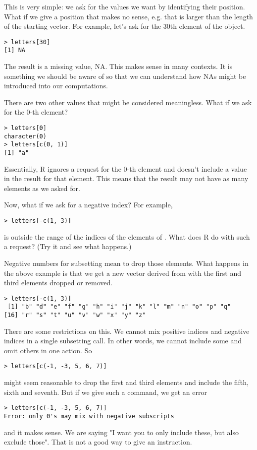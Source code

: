 This is very simple: we ask for the values we want by identifying
their position. What if we give a position that makes no sense,
e.g. that is larger than the length of the starting vector. For
example, let's ask for the 30th element of the 
object.
\begin{verbatim}
> letters[30]
[1] NA
\end{verbatim}
The result is a missing value, NA. This makes sense in many
contexts. It is something we should be aware of so that we can
understand how NAs might be introduced into our computations.

There are two other values that might be considered meaningless. What
if we ask for the 0-th element?
\begin{verbatim}
> letters[0]
character(0)
> letters[c(0, 1)]
[1] "a"
\end{verbatim}
Essentially, R ignores a request for the 0-th element and doesn't
include a value in the result for that element. This means that the
result may not have as many elements as we asked for.

Now, what if we ask for a negative index? For example,
\begin{verbatim}
> letters[-c(1, 3)]
\end{verbatim}
is outside the range of the indices of the elements of
. What does R do with such a request? (Try it and
see what happens.)

Negative numbers for subsetting mean to drop those elements. What
happens in the above example is that we get a new vector derived from
 with the first and third elements dropped or
removed.
\begin{verbatim}
> letters[-c(1, 3)]
 [1] "b" "d" "e" "f" "g" "h" "i" "j" "k" "l" "m" "n" "o" "p" "q"
[16] "r" "s" "t" "u" "v" "w" "x" "y" "z"
\end{verbatim}
There are some restrictions on this. We cannot mix positive indices
and negative indices in a single subsetting call. In other words, we
cannot include some and omit others in one action. So
\begin{verbatim}
> letters[c(-1, -3, 5, 6, 7)]
\end{verbatim}
might seem reasonable to drop the first and third elements and include
the fifth, sixth and seventh. But if we give such a command, we get an
error
\begin{verbatim}
> letters[c(-1, -3, 5, 6, 7)]
Error: only 0's may mix with negative subscripts
\end{verbatim}
and it makes sense. We are saying "I want you to only include these,
but also exclude those". That is not a good way to give an
instruction.

